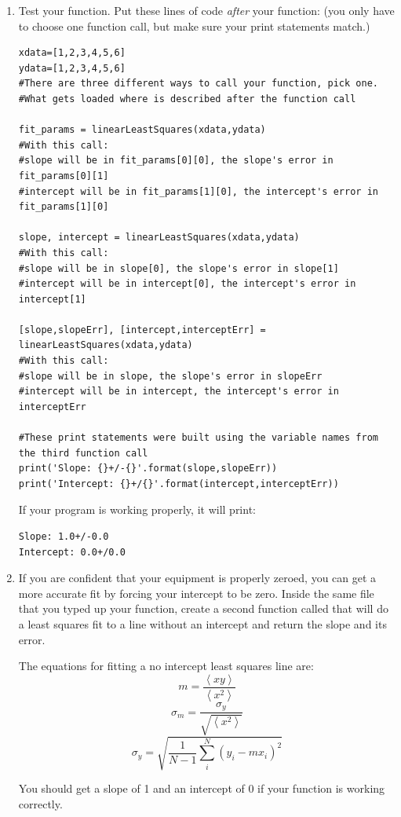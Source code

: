 \documentclass[twoside,11pt,ShortChapTitles]{BYUTextbook}
\begin{document}
\begin{enumerate}
\item Test your function.  Put these lines of code {\em after} your function: (you only have to choose one function call, but make sure your print statements match.)
\begin{Verbatim}
xdata=[1,2,3,4,5,6]
ydata=[1,2,3,4,5,6]
#There are three different ways to call your function, pick one.
#What gets loaded where is described after the function call

fit_params = linearLeastSquares(xdata,ydata)
#With this call:
#slope will be in fit_params[0][0], the slope's error in fit_params[0][1]
#intercept will be in fit_params[1][0], the intercept's error in fit_params[1][0]

slope, intercept = linearLeastSquares(xdata,ydata)
#With this call:
#slope will be in slope[0], the slope's error in slope[1]
#intercept will be in intercept[0], the intercept's error in intercept[1]

[slope,slopeErr], [intercept,interceptErr] = linearLeastSquares(xdata,ydata)
#With this call:
#slope will be in slope, the slope's error in slopeErr
#intercept will be in intercept, the intercept's error in interceptErr

#These print statements were built using the variable names from the third function call
print('Slope: {}+/-{}'.format(slope,slopeErr))
print('Intercept: {}+/{}'.format(intercept,interceptErr))
\end{Verbatim}
If your program is working properly, it will print:
\begin{Verbatim}
Slope: 1.0+/-0.0
Intercept: 0.0+/0.0
\end{Verbatim}

\item If you are confident that your equipment is properly zeroed, you can get a more accurate fit by forcing your intercept to be zero.  Inside the same file that you typed up your  function, create a second function called  that will do a least squares fit to a line without an intercept and return the slope and its error.

The equations for fitting a no intercept least squares line are:
\[m=\frac{\left<xy\right>}{\left<x^2\right>}\]
\[\sigma_m=\frac{\sigma_y}{\sqrt{\left<x^2\right>}}\]
\[\sigma_y=\sqrt{\frac{1}{N-1}\sum_i^N \left(y_i-mx_i\right)^2}\]

You should get a slope of 1 and an intercept of 0 if your function is working correctly.
\end{enumerate}
\end{document}

